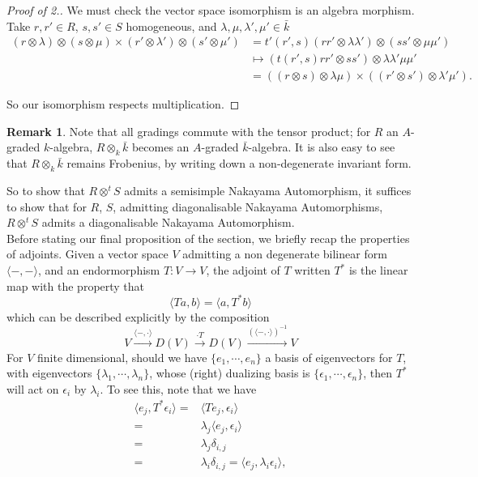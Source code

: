 \documentclass{article}
\theoremstyle{plain}
\theoremstyle{definition}
\newtheorem{remark}[theorem]{Remark}
\begin{document}
\begin{proof}[Proof of 2.] We must check the vector space isomorphism is an algebra morphism. Take $r,r' \in R$, $s,s' \in S$ homogeneous, and $\lambda, \mu, \lambda', \mu' \in \bar{k}$
\begin{align*}
(r \otimes \lambda) \otimes (s \otimes \mu) \times (r' \otimes \lambda') \otimes (s' \otimes \mu') &= t'(r',s) (rr' \otimes \lambda\lambda') \otimes (ss' \otimes \mu\mu') \\
&\mapsto (t(r',s) rr' \otimes ss') \otimes \lambda \lambda' \mu \mu' \\
&= ((r \otimes s) \otimes \lambda\mu) \times ((r' \otimes s') \otimes \lambda'\mu').
\end{align*}

So our isomorphism respects multiplication. 
\end{proof}
\begin{remark} Note that all gradings commute with the tensor product; for $R$ an $A$-graded $k$-algebra, $R\otimes_k \bar{k}$ becomes an $A$-graded $\bar{k}$-algebra. It is also easy to see that $R \otimes_k \bar{k}$ remains Frobenius, by writing down a non-degenerate invariant form. 
\end{remark}
So to show that $R \otimes^t S$ admits a semisimple Nakayama Automorphism, it suffices to show that for $R$, $S$, admitting diagonalisable Nakayama Automorphisms, $R\otimes^t S$ admits a diagonalisable Nakayama Automorphism. \\[5pt]
Before stating our final proposition of the section, we briefly recap the properties of adjoints. Given a vector space $V$ admitting a non degenerate bilinear form $\langle -, - \rangle$, and an endormorphism $T: V\rightarrow V$, the adjoint of $T$ written $T^*$ is the linear map with the property that 
$$\langle Ta, b \rangle = \langle a, T^*b \rangle$$
which can be described explicitly by the composition
$$V \xrightarrow{\langle -, \cdot \rangle} D(V) \xrightarrow{\cdot T} D(V) \xrightarrow{(\langle -, \cdot \rangle)^{-1}} V$$
For $V$ finite dimensional, should we have $\{e_1,\cdots, e_n\}$ a basis of eigenvectors for $T$, with eigenvectors $\{\lambda_1, \cdots, \lambda_n\}$, whose (right) dualizing basis is $\{\epsilon_1, \cdots, \epsilon_n\}$, then $T^*$ will act on $\epsilon_i$ by $\lambda_i$. To see this, note that we have
$$\begin{aligned} \langle e_j, T^*\epsilon_i \rangle = &\langle Te_j, \epsilon_i \rangle\\
= &\lambda_j \langle e_j, \epsilon_i \rangle \\
= & \lambda_j \delta_{i,j} \\
= &\lambda_i \delta_{i,j} = \langle e_j, \lambda_i\epsilon_i \rangle,\end{aligned} $$
\end{document}
